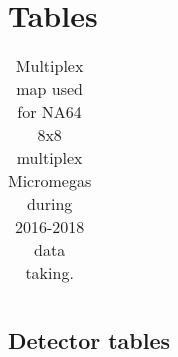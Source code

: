 
\chapter{Tables} %

\label{AppendixF} %

\begin{table}[h!]
  \centering
  \begin{tabular}{|r|l|}
  \end{tabular}
  \caption[original Multiplex map]{Multiplex map used for NA64 8x8 \mms multiplex Micromegas during 2016-2018 data taking.}
  \label{tab:mm-map-original}
\end{table}

\section{Detector tables}
\label{appF:detector-tables}

